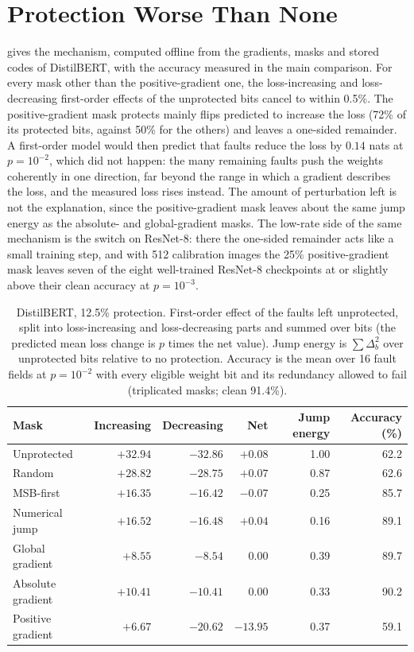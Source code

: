 \section{Protection Worse Than None}\label{app:harm}
 gives the mechanism, computed offline from the gradients, masks and stored codes of DistilBERT, with the accuracy measured in the main comparison. For every mask other than the positive-gradient one, the loss-increasing and loss-decreasing first-order effects of the unprotected bits cancel to within 0.5\%. The positive-gradient mask protects mainly flips predicted to increase the loss (72\% of its protected bits, against 50\% for the others) and leaves a one-sided remainder. A first-order model would then predict that faults reduce the loss by $0.14$ nats at $p=10^{-2}$, which did not happen: the many remaining faults push the weights coherently in one direction, far beyond the range in which a gradient describes the loss, and the measured loss rises instead. The amount of perturbation left is not the explanation, since the positive-gradient mask leaves about the same jump energy as the absolute- and global-gradient masks. The low-rate side of the same mechanism is the switch on ResNet-8: there the one-sided remainder acts like a small training step, and with 512 calibration images the 25\% positive-gradient mask leaves seven of the eight well-trained ResNet-8 checkpoints at or slightly above their clean accuracy at $p=10^{-3}$.

\begin{table}[h]
\caption{DistilBERT, 12.5\% protection. First-order effect of the faults left unprotected, split into loss-increasing and loss-decreasing parts and summed over bits (the predicted mean loss change is $p$ times the net value). Jump energy is $\sum\Delta_b^2$ over unprotected bits relative to no protection. Accuracy is the mean over 16 fault fields at $p=10^{-2}$ with every eligible weight bit and its redundancy allowed to fail (triplicated masks; clean 91.4\%).}\label{tab:drift}
\centering\small
\begin{tabular}{l r r r r r}\toprule
Mask & Increasing & Decreasing & Net & Jump energy & Accuracy (\%)\\\midrule
Unprotected & $+32.94$ & $-32.86$ & $+0.08$ & 1.00 & 62.2\\
Random & $+28.82$ & $-28.75$ & $+0.07$ & 0.87 & 62.6\\
MSB-first & $+16.35$ & $-16.42$ & $-0.07$ & 0.25 & 85.7\\
Numerical jump & $+16.52$ & $-16.48$ & $+0.04$ & 0.16 & 89.1\\
Global gradient & $+8.55$ & $-8.54$ & $0.00$ & 0.39 & 89.7\\
Absolute gradient & $+10.41$ & $-10.41$ & $0.00$ & 0.33 & 90.2\\
Positive gradient & $+6.67$ & $-20.62$ & $-13.95$ & 0.37 & 59.1\\\bottomrule
\end{tabular}
\end{table}

